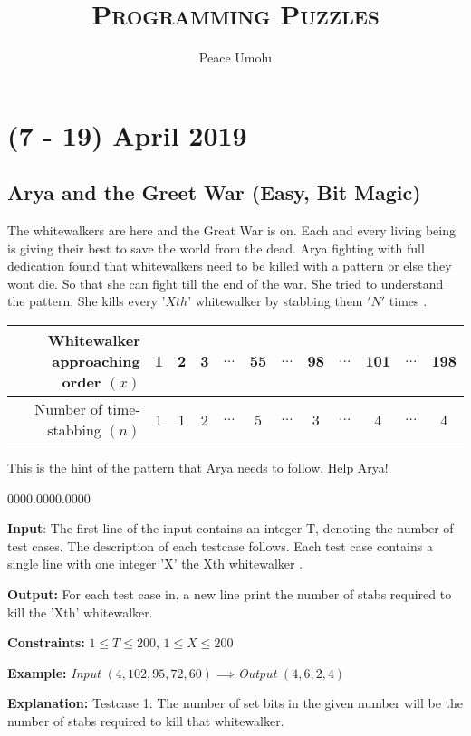 \documentclass[10pt,spanish,9pt,a4]{article}
\newcommand{\noun}[1]{\textsc{#1}}
\providecommand{\tabularnewline}{\\}
\newenvironment{c_list}[1]
	{\begin{list}{}
		{\settowidth{\labelwidth}{#1}
		 \setlength{\leftmargin}{\labelwidth}
		 \addtolength{\leftmargin}{\labelsep}
		 \renewcommand{\makelabel}[1]{##1\hfil}}}
	{\end{list}}
\begin{document}
\title{\noun{Programming Puzzles}}
\author{Peace Umolu}

\maketitle
\tableofcontents{}

\newpage


\section{(7 - 19) April 2019}

\subsection{Arya and the Greet War (Easy, Bit Magic)}

The whitewalkers are here and the Great War is on. Each and every
living being is giving their best to save the world from the dead.
Arya fighting with full dedication found that whitewalkers need to
be killed with a pattern or else they wont die. So that she can fight
till the end of the war. She tried to understand the pattern. She
kills every '$Xth$' whitewalker by stabbing them $'N'$ times .
\begin{center}
\begin{tabular}{|r|c|c|c|c|c|c|c|c|c|c|c|}
\hline 
Whitewalker approaching order $(x)$ & 1 & 2 & 3 & $\ldots$ & 55 & $\ldots$ & 98 & $\ldots$ & 101 & $\ldots$ & 198\tabularnewline
\hline 
Number of time-stabbing $(n)$ & 1 & 1 & 2 & $\ldots$ & 5 & $\ldots$ & 3 & $\ldots$ & 4 & $\ldots$ & 4\tabularnewline
\hline 
\end{tabular}
\par\end{center}

This is the hint of the pattern that Arya needs to follow. Help Arya!
\begin{c_list}{0000.0000.0000}
\item [{\textbf{Input}:}] The first line of the input contains an integer
T, denoting the number of test cases. The description of each testcase
follows. Each test case contains a single line with one integer 'X'
the Xth whitewalker .
\item [{\textbf{Output:}}] For each test case in, a new line print the
number of stabs required to kill the 'Xth' whitewalker.
\item [{\textbf{Constraints:}}] $1\leq T\leq200$, $1\leq X\leq200$
\item [{\textbf{Example:}}] \emph{Input} $\left(4,102,95,72,60\right)\implies$\emph{Output}
$\left(4,6,2,4\right)$
\end{c_list}
\textbf{Explanation: }Testcase 1: The number of set bits in the given
number will be the number of stabs required to kill that whitewalker.
\end{document}
